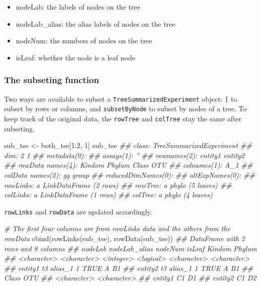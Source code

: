 \documentclass[]{article}
\providecommand{\tightlist}{%
  \setlength{\itemsep}{0pt}\setlength{\parskip}{0pt}}
\newcommand{\hlnum}[1]{\textcolor[rgb]{0.816,0.125,0.439}{#1}}%
\newcommand{\hlstr}[1]{\textcolor[rgb]{0.251,0.627,0.251}{#1}}%
\newcommand{\hlcom}[1]{\textcolor[rgb]{0.502,0.502,0.502}{\textit{#1}}}%
\newcommand{\hlopt}[1]{\textcolor[rgb]{0,0,0}{#1}}%
\newcommand{\hlstd}[1]{\textcolor[rgb]{0.251,0.251,0.251}{#1}}%
\newcommand{\hlkwd}[1]{\textcolor[rgb]{0.878,0.439,0.125}{#1}}%
\newenvironment{Shaded}{\begin{myshaded}}{\end{myshaded}}
\newcommand{\KeywordTok}[1]{\hlkwd{#1}}
\newcommand{\DecValTok}[1]{\hlnum{#1}}
\newcommand{\StringTok}[1]{\hlstr{#1}}
\newcommand{\CommentTok}[1]{\hlcom{#1}}
\newcommand{\OperatorTok}[1]{\hlopt{#1}}
\newcommand{\NormalTok}[1]{\hlstd{#1}}
\begin{document}
\begin{itemize}
\tightlist
\item
  nodeLab: the labels of nodes on the tree
\item
  nodeLab\_alias: the alias labels of nodes on the tree
\item
  nodeNum: the numbers of nodes on the tree
\item
  isLeaf: whether the node is a leaf node
\end{itemize}

\hypertarget{the-subseting-function}{%
\subsubsection{The subseting function}\label{the-subseting-function}}

Two ways are available to subset a \texttt{TreeSummarizedExperiment} object: \texttt{{[}} to
subset by rows or columns, and \texttt{subsetByNode} to subset by nodes of a tree. To
keep track of the original data, the \texttt{rowTree} and \texttt{colTree} stay the same after
subseting.

\begin{Shaded}
\begin{Highlighting}[]
\NormalTok{sub_tse <-}\StringTok{ }\NormalTok{both_tse[}\DecValTok{1}\OperatorTok{:}\DecValTok{2}\NormalTok{, }\DecValTok{1}\NormalTok{]}
\NormalTok{sub_tse}
\CommentTok{## class: TreeSummarizedExperiment }
\CommentTok{## dim: 2 1 }
\CommentTok{## metadata(0):}
\CommentTok{## assays(1): ''}
\CommentTok{## rownames(2): entity1 entity2}
\CommentTok{## rowData names(4): Kindom Phylum Class OTU}
\CommentTok{## colnames(1): A_1}
\CommentTok{## colData names(2): gg group}
\CommentTok{## reducedDimNames(0):}
\CommentTok{## altExpNames(0):}
\CommentTok{## rowLinks: a LinkDataFrame (2 rows)}
\CommentTok{## rowTree: a phylo (5 leaves)}
\CommentTok{## colLinks: a LinkDataFrame (1 rows)}
\CommentTok{## colTree: a phylo (4 leaves)}
\end{Highlighting}
\end{Shaded}

\texttt{rowLinks} and \texttt{rowData} are updated accordingly.

\begin{Shaded}
\begin{Highlighting}[]
\CommentTok{# The first four columns are from rowLinks data and the others from the rowData}
\KeywordTok{cbind}\NormalTok{(}\KeywordTok{rowLinks}\NormalTok{(sub_tse), }\KeywordTok{rowData}\NormalTok{(sub_tse))}
\CommentTok{## DataFrame with 2 rows and 8 columns}
\CommentTok{##             nodeLab nodeLab_alias   nodeNum    isLeaf      Kindom      Phylum}
\CommentTok{##         <character>   <character> <integer> <logical> <character> <character>}
\CommentTok{## entity1          t3       alias_1         1      TRUE           A          B1}
\CommentTok{## entity2          t3       alias_1         1      TRUE           A          B1}
\CommentTok{##               Class         OTU}
\CommentTok{##         <character> <character>}
\CommentTok{## entity1          C1          D1}
\CommentTok{## entity2          C1          D2}
\end{Highlighting}
\end{Shaded}
\end{document}
